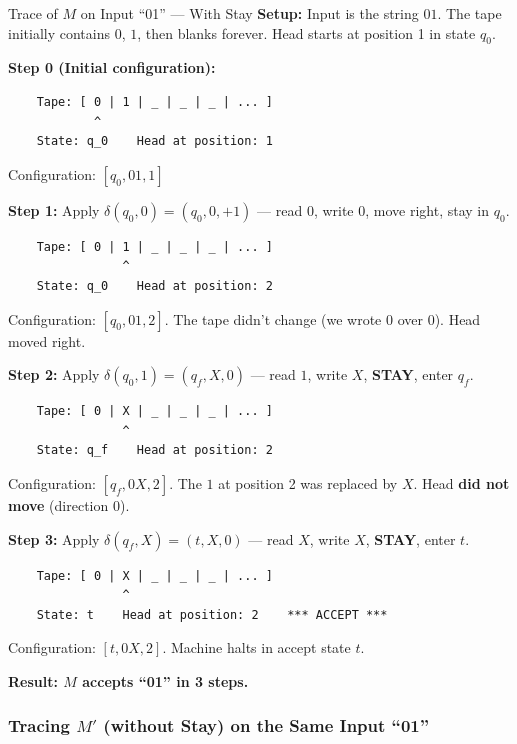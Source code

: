 \begin{examplebox}{Trace of $M$ on Input ``01'' --- With Stay}
\textbf{Setup:} Input is the string $01$. The tape initially contains $0$, $1$, then blanks forever. Head starts at position 1 in state $q_0$.

\textbf{Step 0 (Initial configuration):}
\begin{lstlisting}
    Tape: [ 0 | 1 | _ | _ | _ | ... ]
            ^
    State: q_0    Head at position: 1
\end{lstlisting}
Configuration: $[q_0, 01, 1]$

\textbf{Step 1:} Apply $\delta(q_0, 0) = (q_0, 0, +1)$ --- read $0$, write $0$, move right, stay in $q_0$.
\begin{lstlisting}
    Tape: [ 0 | 1 | _ | _ | _ | ... ]
                ^
    State: q_0    Head at position: 2
\end{lstlisting}
Configuration: $[q_0, 01, 2]$. The tape didn't change (we wrote $0$ over $0$). Head moved right.

\textbf{Step 2:} Apply $\delta(q_0, 1) = (q_f, X, 0)$ --- read $1$, write $X$, \textbf{STAY}, enter $q_f$.
\begin{lstlisting}
    Tape: [ 0 | X | _ | _ | _ | ... ]
                ^
    State: q_f    Head at position: 2
\end{lstlisting}
Configuration: $[q_f, 0X, 2]$. The $1$ at position 2 was replaced by $X$. Head \textbf{did not move} (direction $0$).

\textbf{Step 3:} Apply $\delta(q_f, X) = (t, X, 0)$ --- read $X$, write $X$, \textbf{STAY}, enter $t$.
\begin{lstlisting}
    Tape: [ 0 | X | _ | _ | _ | ... ]
                ^
    State: t    Head at position: 2    *** ACCEPT ***
\end{lstlisting}
Configuration: $[t, 0X, 2]$. Machine halts in accept state $t$.

\textbf{Result: $M$ accepts ``01'' in 3 steps.}
\end{examplebox}

\subsubsection{Tracing $M'$ (without Stay) on the Same Input ``01''}

